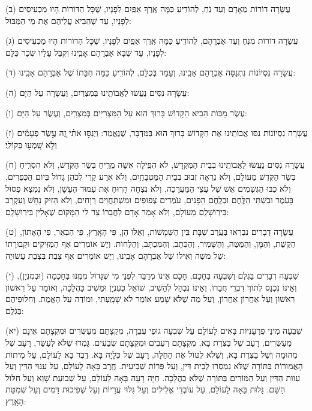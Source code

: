 \documentclass[twoside, openany, parskip=half, 11pt]{book}
\begin{document}
(ב)
 עֲשָׂרָה דוֹרוֹת מֵאָדָם וְעַד נֹֽחַ, לְהוֹדִֽיעַ כַּמָּה אֶֽרֶךְ אַפַּֽיִם לְפָנָיו, שֶׁכָּל הַדּוֹרוֹת הָיוּ מַכְעִיסִים לְפָנָיו, עַד שֶׁהֵבִיא עֲלֵיהֶם אֶת מֵי הַמַּבּוּל:

(ג)
 עֲשָׂרָה דוֹרוֹת מִנֹּֽחַ וְעַד אַבְרָהָם, לְהוֹדִֽיעַ כַּמָּה אֶֽרֶךְ אַפַּֽיִם לְפָנָיו, שֶׁכָּל הַדּוֹרוֹת הָיוּ מַכְעִיסִים לְפָנָיו, עַד שֶׁבָּא אַבְרָהָם אָבִֽינוּ וְקִבֵּל עָלָיו שְׂכַר כֻּלָּם: 

(ד)
 עֲשָׂרָה נִסְיוֹנוֹת נִתְנַסָּה אַבְרָהָם אָבִֽינוּ, וְעָמַד בְּכֻלָּם, לְהוֹדִֽיעַ כַּמָּה חִבָּתוֹ שֶׁל אַבְרָהָם אָבִֽינוּ: 

(ה)
 עֲשָׂרָה נִסִּים נַעֲשׂוּ לַאֲבוֹתֵֽינוּ בְּמִצְרַיִם, וַעֲשָׂרָה עַל הַיָּם: 

(ו)
 עֶשֶׂר מַכּוֹת הֵבִיא הַקָּדוֹשׁ בָּרוּךְ הוּא עַל הַמִּצְרִיִּים בְּמִצְרַֽיִם, וְעֶשֶׂר עַל הַיָּם: 

(ז)
 עֲשָׂרָה נִסְיוֹנוֹת נִסּוּ אֲבוֹתֵֽינוּ אֶת הַקָּדוֹשׁ בָּרוּךְ הוּא בַּמִּדְבָּר, שֶׁנֶּאֱמַר:  וַיְנַסּ֣וּ אֹתִ֗י זֶ֚ה עֶ֣שֶׂר פְּעָמִ֔ים וְלֹ֥א שָֽׁמְע֖וּ בְּקוֹלִֽי׃

(ח)
 עֲשָׂרָה נִסִּים נַעֲשׂוּ לַאֲבוֹתֵֽינוּ בְּבֵית הַמִּקְדָּשׁ, לֹא הִפִּֽילָה אִשָּׁה מֵרֵֽיחַ בְּשַׂר הַקֹּֽדֶשׁ, וְלֹא הִסְרִֽיחַ בְּשַׂר הַקֹּֽדֶשׁ מֵעוֹלָם, וְלֹא נִרְאָה זְבוּב בְּבֵית הַמַּטְבָּחַֽיִם, וְלֹא אִרָע קֶֽרִי לְכֹהֵן גָּדוֹל בְּיוֹם הַכִּפֻּרִים, וְלֹא כִבּוּ הַגְּשָׁמִים אֵשׁ שֶׁל עֲצֵי הַמַּעֲרָכָה, וְלֹא נִצְחָה הָרֽוּחַ אֶת עַמּוּד הֶעָשָׁן, וְלֹא נִמְצָא פְסוּל בָּעֹֽמֶר וּבִשְׁתֵּי הַלֶּֽחֶם וּבְלֶֽחֶם הַפָּנִים, עֹמְדִים צְפוּפִים וּמִשְׁתַּחֲוִים רְוָחִים, וְלֹא הִזִּיק נָחָשׁ וְעַקְרָב בִּירֽוּשָׁלַֽםִ מֵעוֹלָם, וְלֹא אָמַר אָדָם לַחֲבֵרוֹ צַר לִי הַמָּקוֹם שֶׁאָלִין בִּירֽוּשָׁלָֽםִ: 

(ט)
 עֲשָׂרָה דְבָרִים נִבְרְאוּ בְּעֶֽרֶב שַׁבָּת בֵּין הַשְּׁמָשׁוֹת, וְאֵלּו הֵן, פִּי הָאָֽרֶץ, פִּי הַבְּאֵר, פִּי הָאָתוֹן, הַקֶּשֶׁת, וְהַמָּן, וְהַמַּטֶּה, וְהַשָּׁמִיר, וְהַכְּתָב, וְהַמִּכְתָּב, וְהַלֻּחוֹת. וְיֵשׁ אוֹמְרִים אַף הַמַּזִּיקִים וּקְבוּרָתוֹ שֶׁל משֶׁה וְאֵילוֹ שֶׁל אַבְרָהָם אָבִֽינוּ, וְיֵשׁ אוֹמְרִים אַף צְבַת בִּצְבַת עֲשׂוּיָה: 

(י) שִׁבְעָה דְבָרִים בַּגֹֽלֶם וְשִׁבְעָה בְּחָכָם, חָכָם אֵינוֹ מְדַבֵּר לִפְנֵי מִי שֶׁגָּדוֹל מִמֶּֽנּוּ בְּחָכְמָה (וּבְמִנְיָן), וְאֵינוֹ נִכְנָס לְתוֹךְ דִּבְרֵי חֲבֵרוֹ, וְאֵינוֹ נִבְהָל לְהָשִׁיב, שׁוֹאֵל כְּעִנְיָן וּמֵשִׁיב כַּהֲלָכָה, וְאוֹמֵר עַל רִאשׁוֹן רִאשׁוֹן וְעַל אַחֲרוֹן אַחֲרוֹן, וְעַל מַה שֶׁלֹּא שָׁמַע אוֹמֵר לֹא שָׁמָֽעְתִּי, וּמוֹדֶה עַל הָאֱמֶת. וְחִלּוּפֵיהֶם בְּגֹֽלֶם: 

(יא)
 שִׁבְעָה מִינֵי פֻרְעָנִיּוֹת בָּאִים לָעוֹלָם עַל שִׁבְעָה גוּפֵי עֲבֵרָה, מִקְצָתָם מְעַשְּׂרִים וּמִקְצָתָם אֵינָם מְעַשְּׂרִים, רָעָב שֶׁל בַּצֹּֽרֶת בָּא, מִקְצָתָם רְעֵבִים וּמִקְצָתָם שְׂבֵעִים. גָּמְרוּ שֶׁלֹּא לְעַשֵּׂר, רָעָב שֶׁל מְהוּמָה וְשֶׁל בַּצֹּֽרֶת בָּא, וְשֶׁלֹּא לִטּוֹל אֶת הַחַלָּה, רָעָב שֶׁל כְּלָיָה בָּא. דֶּֽבֶר בָּא לָעוֹלָם, עַל מִיתוֹת הָאֲמוּרוֹת בַּתּוֹרָה שֶׁלֹּא נִמְסְרוּ לְבֵית דִּין, וְעַל פֵּרוֹת שְׁבִיעִית. חֶֽרֶב בָּאָה לָעוֹלָם, עַל עִנּוּי הַדִּין וְעַל עִוּוּת הַדִּין וְעַל הַמּוֹרִים בַּתּוֹרָה שֶׁלֹּא כַהֲלָכָה. חַיָּה רָעָה בָּאָה לָעוֹלָם, עַל שְׁבוּעַת שָׁוְא וְעַל חִלּוּל הַשֵּׁם. גָּלוּת בָּאָה לָעוֹלָם, עַל עוֹבְדֵי אֱלִילִים וְעַל גִּלּוּי עֲרָיוֹת וְעַל שְׁפִיכוּת דָּמִים וְעַל שְׁמִטַּת הָאָֽרֶץ: 
\end{document}
